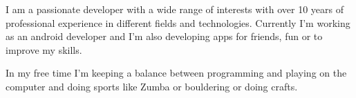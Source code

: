 

\begin{cvparagraph}

I am a passionate developer with a wide range of interests with over 10 years of professional experience in different fields and technologies. Currently I'm working as an android developer and I'm also developing apps for friends, fun or to improve my skills. 

In my free time I'm keeping a balance between programming and playing on the computer and doing sports like Zumba or bouldering or doing crafts.
\end{cvparagraph}
